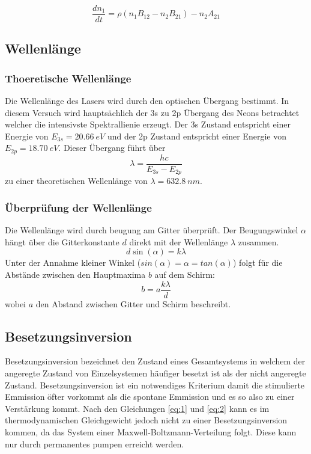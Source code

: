 \begin{equation}
    \label{eq:2}
    \frac{dn_1}{dt}=\rho(n_1B_{12}-n_2B_{21})-n_2A_{21}
\end{equation}

\subsection{Wellenlänge}
\label{sec:wellenlaenge}
\subsubsection{Thoeretische Wellenlänge}
Die Wellenlänge des Lasers wird durch den optischen Übergang bestimmt. In diesem Versuch wird 
hauptsächlich der 3s zu 2p Übergang des Neons betrachtet welcher die intensivste Spektrallienie 
erzeugt. Der 3s Zustand entspricht einer Energie von $E_{3s}=\SI[]{20.66}[]{eV}$ und der 2p
Zustand entspricht einer Energie von $E_{2p}=\SI[]{18.70}[]{eV}$. Dieser Übergang führt über
\begin{equation}
    \lambda=\frac{hc}{E_{3s}-E_{2p}}
\end{equation}
zu einer theoretischen Wellenlänge von $\lambda=\SI[]{632.8}[]{nm}$.
\subsubsection{Überprüfung der Wellenlänge}
Die Wellenlänge wird durch beugung am Gitter überprüft. Der Beugungswinkel $\alpha$ hängt
über die Gitterkonstante $d$ direkt mit der Wellenlänge $\lambda$ zusammen.
\begin{equation}
    d\sin(\alpha)=k\lambda
\end{equation}
Unter der Annahme kleiner Winkel ($sin(\alpha)=\alpha=tan(\alpha)$) folgt für die Abstände 
zwischen den Hauptmaxima $b$ auf dem Schirm:
\begin{equation}
    b=a\frac{k\lambda}{d}
\end{equation}
wobei $a$ den Abstand zwischen Gitter und Schirm beschreibt.

\subsection{Besetzungsinversion}
\label{sec:Besetzungsinversion}
Besetzungsinversion bezeichnet den Zustand eines Gesamtsystems in welchem der angeregte Zustand von 
Einzelsystemen häufiger besetzt ist als der nicht angeregte Zustand. Besetzungsinversion ist ein notwendiges
Kriterium damit die stimulierte Emmission öfter vorkommt als die spontane Emmission und es so also zu einer
Verstärkung kommt. Nach den Gleichungen \autoref{eq:1} und \autoref{eq:2} kann es im thermodynamischen
Gleichgewicht jedoch nicht zu einer Besetzungsinversion kommen, da das System einer Maxwell-Boltzmann-Verteilung 
folgt. Diese kann nur durch permanentes pumpen erreicht werden. 

